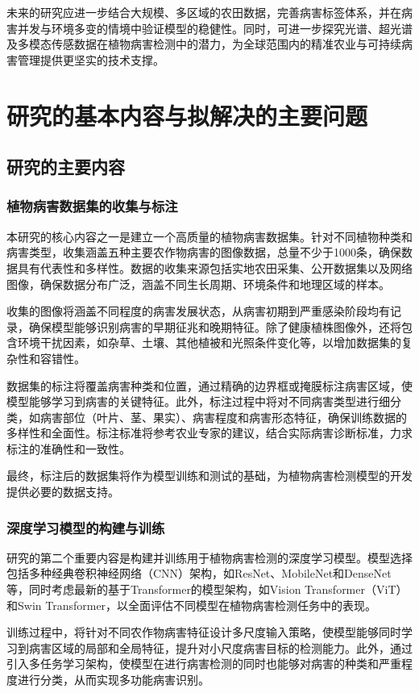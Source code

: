 未来的研究应进一步结合大规模、多区域的农田数据，完善病害标签体系，并在病害并发与环境多变的情境中验证模型的稳健性。同时，可进一步探究光谱、超光谱及多模态传感数据在植物病害检测中的潜力\cite{20}，为全球范围内的精准农业与可持续病害管理提供更坚实的技术支撑。

\section{研究的基本内容与拟解决的主要问题}
\subsection{研究的主要内容}
\subsubsection{植物病害数据集的收集与标注}
本研究的核心内容之一是建立一个高质量的植物病害数据集。针对不同植物种类和病害类型，收集涵盖五种主要农作物病害的图像数据，总量不少于1000条，确保数据具有代表性和多样性。数据的收集来源包括实地农田采集、公开数据集以及网络图像，确保数据分布广泛，涵盖不同生长周期、环境条件和地理区域的样本。

收集的图像将涵盖不同程度的病害发展状态，从病害初期到严重感染阶段均有记录，确保模型能够识别病害的早期征兆和晚期特征。除了健康植株图像外，还将包含环境干扰因素，如杂草、土壤、其他植被和光照条件变化等，以增加数据集的复杂性和容错性。

数据集的标注将覆盖病害种类和位置，通过精确的边界框或掩膜标注病害区域，使模型能够学习到病害的关键特征。此外，标注过程中将对不同病害类型进行细分类，如病害部位（叶片、茎、果实）、病害程度和病害形态特征，确保训练数据的多样性和全面性。标注标准将参考农业专家的建议，结合实际病害诊断标准，力求标注的准确性和一致性。

最终，标注后的数据集将作为模型训练和测试的基础，为植物病害检测模型的开发提供必要的数据支持。

\subsubsection{深度学习模型的构建与训练}
研究的第二个重要内容是构建并训练用于植物病害检测的深度学习模型。模型选择包括多种经典卷积神经网络（CNN）架构，如ResNet、MobileNet和DenseNet等，同时考虑最新的基于Transformer的模型架构，如Vision Transformer（ViT）和Swin Transformer，以全面评估不同模型在植物病害检测任务中的表现。

训练过程中，将针对不同农作物病害特征设计多尺度输入策略，使模型能够同时学习到病害区域的局部和全局特征，提升对小尺度病害目标的检测能力。此外，通过引入多任务学习架构，使模型在进行病害检测的同时也能够对病害的种类和严重程度进行分类，从而实现多功能病害识别。

